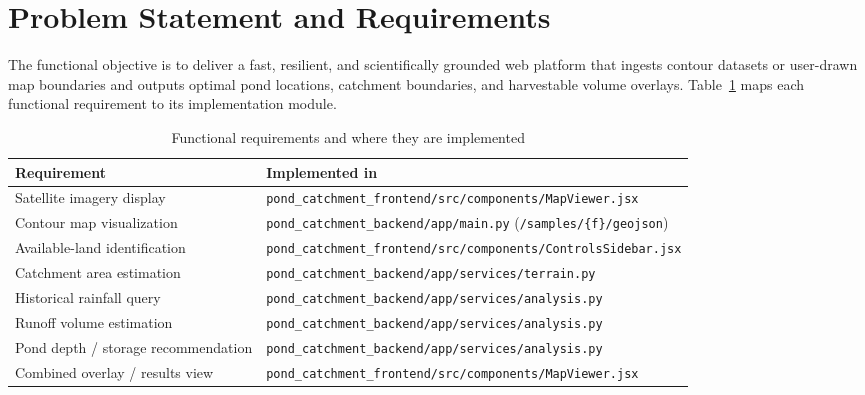 \documentclass[manuscript,screen,review]{acmart}
\begin{document}
\section{Problem Statement and Requirements}
\label{sec:requirements}
The functional objective is to deliver a fast, resilient, and scientifically grounded web platform that ingests contour datasets or user-drawn map boundaries and outputs optimal pond locations, catchment boundaries, and harvestable volume overlays. Table~\ref{tab:requirements} maps each functional requirement to its implementation module.

\begin{table}[h]
  \caption{Functional requirements and where they are implemented}
  \label{tab:requirements}
  \begin{tabular}{p{5.5cm}p{7.5cm}}
    \toprule
    Requirement & Implemented in \\
    \midrule
    Satellite imagery display & \texttt{pond\_catchment\_frontend/src/components/MapViewer.jsx} \\
    Contour map visualization & \texttt{pond\_catchment\_backend/app/main.py} (\texttt{/samples/\{f\}/geojson}) \\
    Available-land identification & \texttt{pond\_catchment\_frontend/src/components/ControlsSidebar.jsx} \\
    Catchment area estimation & \texttt{pond\_catchment\_backend/app/services/terrain.py} \\
    Historical rainfall query & \texttt{pond\_catchment\_backend/app/services/analysis.py} \\
    Runoff volume estimation & \texttt{pond\_catchment\_backend/app/services/analysis.py} \\
    Pond depth / storage recommendation & \texttt{pond\_catchment\_backend/app/services/analysis.py} \\
    Combined overlay / results view & \texttt{pond\_catchment\_frontend/src/components/MapViewer.jsx} \\
    \bottomrule
  \end{tabular}
\end{table}
\end{document}
